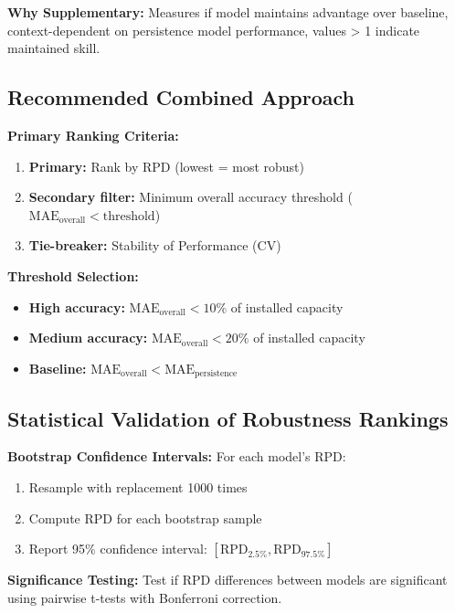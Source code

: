 \documentclass[11pt,a4paper]{article}
\begin{document}
\textbf{Why Supplementary:} Measures if model maintains advantage over baseline, context-dependent on persistence model performance, values > 1 indicate maintained skill.

\subsection{Recommended Combined Approach}

\begin{validationbox}
\textbf{Primary Ranking Criteria:}

\begin{enumerate}
    \item \textbf{Primary:} Rank by RPD (lowest = most robust)
    \item \textbf{Secondary filter:} Minimum overall accuracy threshold ($\text{MAE}_{\text{overall}} < \text{threshold}$)
    \item \textbf{Tie-breaker:} Stability of Performance (CV)
\end{enumerate}

\textbf{Threshold Selection:}
\begin{itemize}
    \item \textbf{High accuracy:} $\text{MAE}_{\text{overall}} < 10\%$ of installed capacity
    \item \textbf{Medium accuracy:} $\text{MAE}_{\text{overall}} < 20\%$ of installed capacity
    \item \textbf{Baseline:} $\text{MAE}_{\text{overall}} < \text{MAE}_{\text{persistence}}$
\end{itemize}
\end{validationbox}

\subsection{Statistical Validation of Robustness Rankings}

\textbf{Bootstrap Confidence Intervals:}
For each model's RPD:
\begin{enumerate}
    \item Resample with replacement 1000 times
    \item Compute RPD for each bootstrap sample
    \item Report 95\% confidence interval: $[\text{RPD}_{2.5\%}, \text{RPD}_{97.5\%}]$
\end{enumerate}

\textbf{Significance Testing:} Test if RPD differences between models are significant using pairwise t-tests with Bonferroni correction.
\end{document}
